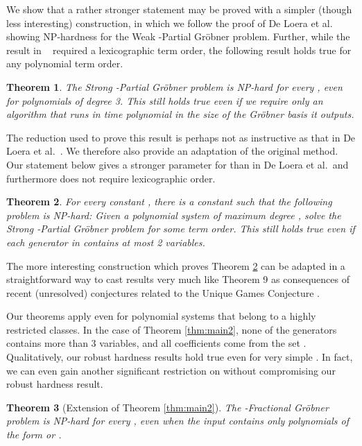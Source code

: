 \documentclass{article}
\newtheorem{thm}{Theorem}
\begin{document}
We show that a rather stronger statement may be proved with a simpler (though less interesting) construction, in which we follow the proof of De Loera et al.~\cite{deloera} showing NP-hardness for the Weak \nobreakdash-Partial Gr\"obner problem. Further, while the result in ~\cite{deloera} required a lexicographic term order, the following result holds true for any polynomial term order.

\begin{thm} 
The Strong \nobreakdash-Partial Gr\"obner problem is NP-hard for every , even for polynomials of degree 3.  This still holds true even if we require only an algorithm that runs in time polynomial in the \emph{size of the Gr\"{o}bner basis} it outputs.
\label{thm:stronger}
\end{thm}

The reduction used to prove this result is perhaps not as instructive as that in De Loera et al.~\cite{deloera}. We therefore also provide an adaptation of the original method. Our statement below gives a stronger parameter for  than in De Loera et al.~and furthermore does not require lexicographic order.

\begin{thm}\label{prop:lundgroebner}
For every constant , there is a constant  such that the following problem is NP-hard: Given a polynomial system of maximum degree , solve the Strong \nobreakdash-Partial Gr\"{o}bner problem for some term order. This still holds true even if each generator in  contains at most 2 variables.
\end{thm}

The more interesting construction which proves Theorem \ref{prop:lundgroebner} can be adapted in a straightforward way to cast results very much like Theorem 9 as consequences of recent (unresolved) conjectures related to the Unique Games Conjecture \cite{Khot02}.

Our theorems apply even for polynomial systems that belong to a highly restricted classes.  In the case of Theorem \ref{thm:main2}, none of the generators contains more than 3 variables, and all coefficients come from the set . Qualitatively, our robust hardness results hold true even for very simple . In fact, we can even gain another significant restriction on  without compromising our robust hardness result.

\begin{thm}[Extension of Theorem \ref{thm:main2}] \label{thm:main3}
The \nobreakdash-Fractional Gr\"{o}bner problem is NP-hard for every , even when the input contains only polynomials of the form  or .
\end{thm}
\end{document}
